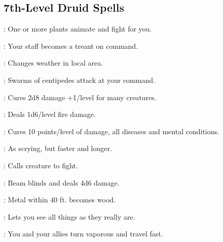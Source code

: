 \begin{multicols}{2}
\subsection{7th-Level Druid Spells}
\begin{description*}
\item[\linkspell{Animate Plants}:] One or more plants animate and fight for you.
\item[\linkspell{Changestaff}:] Your staff becomes a treant on command.
\item[\linkspell{Control Weather}:] Changes weather in local area.
\item[\linkspell{Creeping Doom}:] Swarms of centipedes attack at your command.
\item[\linkspell{Cure Moderate Wounds, Mass}:] Cures 2d8 damage +1/level for many creatures.
\item[\linkspell{Fire Storm}:] Deals 1d6/level fire damage.
\item[\linkspell{Heal}:] Cures 10 points/level of damage, all diseases and mental conditions.
\item[\linkspell{Scrying, Greater}:] As scrying, but faster and longer.
\item[\linkspell{Summon Nature’s Ally VII}:] Calls creature to fight.
\item[\linkspell{Sunbeam}:] Beam blinds and deals 4d6 damage.
\item[\linkspell{Transmute Metal to Wood}:] Metal within 40 ft. becomes wood.
\item[\linkspell{True Seeing}:] Lets you see all things as they really are.
\item[\linkspell{Wind Walk}:] You and your allies turn vaporous and travel fast.
\end{description*}


\end{multicols}
